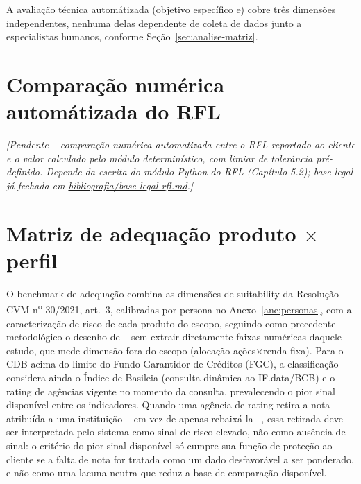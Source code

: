 \label{ane:instrumento-avaliacao}

A avalia\c{c}\~ao t\'ecnica autom\'atizada (objetivo espec\'ifico e)
cobre tr\^es dimens\~oes independentes, nenhuma delas dependente de
coleta de dados junto a especialistas humanos, conforme
Se\c{c}\~ao~\ref{sec:analise-matriz}.

\section{Compara\c{c}\~ao num\'erica autom\'atizada do RFL}
\label{sec:instrumento-rfl}


\textit{[Pendente -- compara\c{c}\~ao num\'erica automatizada entre o
RFL reportado ao cliente e o valor calculado pelo m\'odulo
determin\'istico, com limiar de toler\^ancia pr\'e-definido. Depende da
escrita do m\'odulo Python do RFL (Cap\'itulo 5.2); base legal j\'a
fechada em \url{bibliografia/base-legal-rfl.md}.]}

\section{Matriz de adequa\c{c}\~ao produto \texorpdfstring{$\times$}{x} perfil}
\label{sec:instrumento-suitability}

O benchmark de adequa\c{c}\~ao combina as dimens\~oes de suitability da
Resolu\c{c}\~ao CVM n\textsuperscript{o} 30/2021, art.\
3\textordmasculine{}, calibradas por persona no Anexo~\ref{ane:personas},
com a caracteriza\c{c}\~ao de risco de cada produto do escopo,
seguindo como precedente metodol\'ogico o desenho de
\textcite{oehler2024} -- sem extrair diretamente faixas num\'ericas
daquele estudo, que mede dimens\~ao fora do escopo (aloca\c{c}\~ao
a\c{c}\~oes$\times$renda-fixa). Para o CDB acima do limite do Fundo
Garantidor de Cr\'editos (FGC), a classifica\c{c}\~ao considera ainda o
\'Indice de Basileia (consulta din\^amica ao IF.data/BCB) e o rating de
ag\^encias vigente no momento da consulta, prevalecendo o pior sinal
dispon\'ivel entre os indicadores. Quando uma ag\^encia de rating
retira a nota atribu\'ida a uma institui\c{c}\~ao -- em vez de apenas
rebaix\'a-la --, essa retirada deve ser interpretada pelo sistema como
sinal de risco elevado, n\~ao como aus\^encia de sinal: o crit\'erio do
pior sinal dispon\'ivel s\'o cumpre sua fun\c{c}\~ao de prote\c{c}\~ao ao
cliente se a falta de nota for tratada como um dado desfavor\'avel a
ser ponderado, e n\~ao como uma lacuna neutra que reduz a base de
compara\c{c}\~ao dispon\'ivel.

